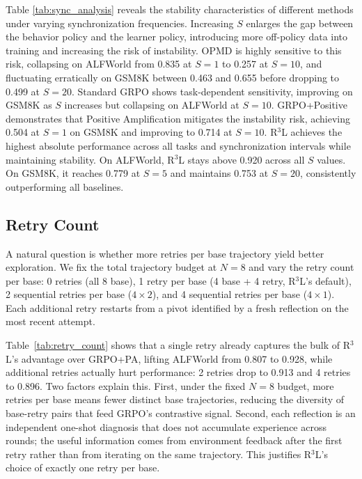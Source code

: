 \documentclass[11pt]{article}
\theoremstyle{definition}
\theoremstyle{remark}
\begin{document}


Table \ref{tab:sync_analysis} reveals the stability characteristics of different methods under varying synchronization frequencies. Increasing $S$ enlarges the gap between the behavior policy and the learner policy, introducing more off-policy data into training and increasing the risk of instability. OPMD is highly sensitive to this risk, collapsing on ALFWorld from 0.835 at $S=1$ to 0.257 at $S=10$, and fluctuating erratically on GSM8K between 0.463 and 0.655 before dropping to 0.499 at $S=20$. Standard GRPO shows task-dependent sensitivity, improving on GSM8K as $S$ increases but collapsing on ALFWorld at $S=10$. GRPO+Positive demonstrates that Positive Amplification mitigates the instability risk, achieving 0.504 at $S=1$ on GSM8K and improving to 0.714 at $S=10$. R$^3$L achieves the highest absolute performance across all tasks and synchronization intervals while maintaining stability. On ALFWorld, R$^3$L stays above 0.920 across all $S$ values. On GSM8K, it reaches 0.779 at $S=5$ and maintains 0.753 at $S=20$, consistently outperforming all baselines.

\subsection{Retry Count}
\label{sec:retry_count}

A natural question is whether more retries per base trajectory yield better exploration. We fix the total trajectory budget at $N=8$ and vary the retry count per base: 0 retries (all 8 base), 1 retry per base (4 base + 4 retry, R$^3$L's default), 2 sequential retries per base ($4 \times 2$), and 4 sequential retries per base ($4 \times 1$). Each additional retry restarts from a pivot identified by a fresh reflection on the most recent attempt.



Table~\ref{tab:retry_count} shows that a single retry already captures the bulk of R$^3$L's advantage over GRPO+PA, lifting ALFWorld from 0.807 to 0.928, while additional retries actually hurt performance: 2 retries drop to 0.913 and 4 retries to 0.896. Two factors explain this. First, under the fixed $N=8$ budget, more retries per base means fewer distinct base trajectories, reducing the diversity of base-retry pairs that feed GRPO's contrastive signal. Second, each reflection is an independent one-shot diagnosis that does not accumulate experience across rounds; the useful information comes from environment feedback after the first retry rather than from iterating on the same trajectory. This justifies R$^3$L's choice of exactly one retry per base.
\end{document}
